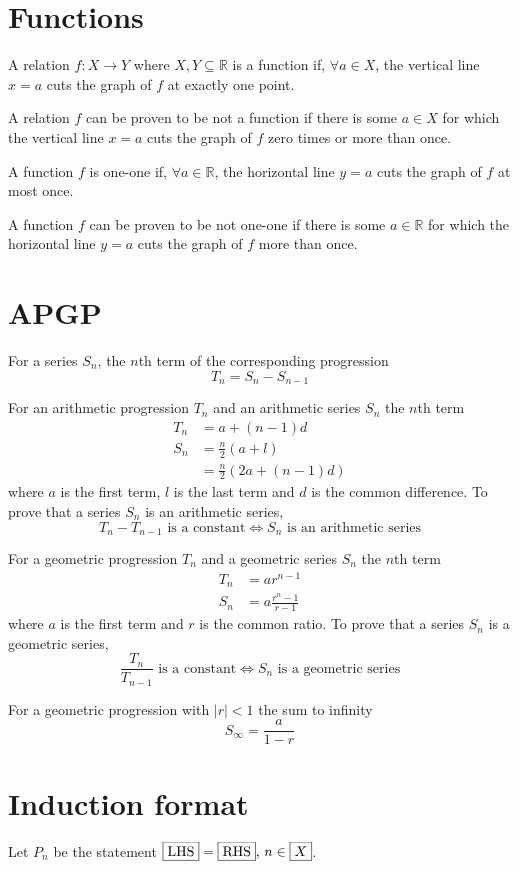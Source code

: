 \documentclass{slnotes}
\newcommand*{\slbx}[1]{{\ifmmode\smash{\boxed{#1\vphantom{X}}}\else\smash{\fbox{#1\vphantom{X}}}\fi}}
\begin{document}
\chapter{Functions}
A relation \(f \colon X \to Y\) where \(X, Y \subseteq \mathbb R\) is a function if, \(\mathrel\forall a \in X\), the vertical line \(x = a\) cuts the graph of \(f\) at exactly one point.

A relation \(f\) can be proven to be not a function if there is some \(a \in X\) for which the vertical line \(x = a\) cuts the graph of \(f\) zero times or more than once.

A function \(f\) is one-one if, \(\mathrel\forall a \in \mathbb R\), the horizontal line \(y = a\) cuts the graph of \(f\) at most once.

A function \(f\) can be proven to be not one-one if there is some \(a \in \mathbb R\) for which the horizontal line \(y = a\) cuts the graph of \(f\) more than once.
\chapter{APGP}
For a series \(S_n\), the \(n\)th term of the corresponding progression \[T_n = S_n - S_{n-1}\]

For an arithmetic progression \(T_n\) and an arithmetic series \(S_n\) the \(n\)th term \begin{align*}T_n &= a + (n-1)d\\S_n &= \frac{n}{2}(a + l)\\&= \frac{n}{2}(2a+(n-1)d)\end{align*} where \(a\) is the first term, \(l\) is the last term and \(d\) is the common difference. To prove that a series \(S_n\) is an arithmetic series, \[T_n - T_{n-1}\text{ is a constant} \iff S_n\text{ is an arithmetic series}\]

For a geometric progression \(T_n\) and a geometric series \(S_n\) the \(n\)th term \begin{align*}T_n &= ar^{n-1}\\S_n &= a\frac{r^n-1}{r-1}\end{align*} where \(a\) is the first term and \(r\) is the common ratio. To prove that a series \(S_n\) is a geometric series, \[\frac{T_n}{T_{n-1}}\text{ is a constant} \iff S_n\text{ is a geometric series}\]

For a geometric progression with \(|r| < 1\) the sum to infinity \[S_\infty = \frac{a}{1-r}\]
\chapter{Induction format}
Let \(P_n\) be the statement \(\slbx{\text{LHS}} = \slbx{\text{RHS}}\text{, }n \in \slbx{X}\).
\end{document}
